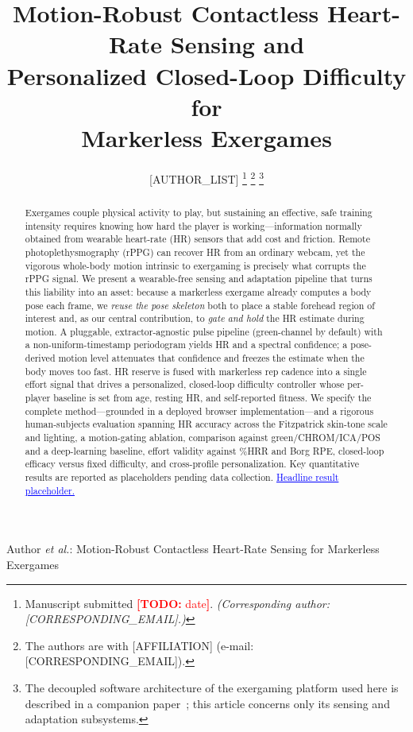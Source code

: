\documentclass[journal,10pt]{IEEEtran}
\newcommand{\todoNote}[1]{\textcolor{red}{\textbf{[TODO:} #1\textbf{]}}}
\newcommand{\result}[1]{\textcolor{blue}{\underline{#1}}}
\begin{document}
\title{Motion-Robust Contactless Heart-Rate Sensing and\\ Personalized Closed-Loop Difficulty for\\ Markerless Exergames}

\author{%
        [AUTHOR\_LIST]%
        \thanks{Manuscript submitted \todoNote{date}. \emph{(Corresponding author: [CORRESPONDING\_EMAIL].)}}%
        \thanks{The authors are with [AFFILIATION] (e-mail: [CORRESPONDING\_EMAIL]).}%
        \thanks{The decoupled software architecture of the exergaming platform used here is described in a companion paper~\cite{fitarcade-sdps}; this article concerns only its sensing and adaptation subsystems.}}

%
{Author \MakeLowercase{\textit{et al.}}: Motion-Robust Contactless Heart-Rate Sensing for Markerless Exergames}

\maketitle

\begin{abstract}
Exergames couple physical activity to play, but sustaining an effective, safe
training intensity requires knowing how hard the player is working---information
normally obtained from wearable heart-rate (HR) sensors that add cost and
friction. Remote photoplethysmography (rPPG) can recover HR from an ordinary
webcam, yet the vigorous whole-body motion intrinsic to exergaming is precisely
what corrupts the rPPG signal. We present a wearable-free sensing and adaptation
pipeline that turns this liability into an asset: because a markerless exergame
already computes a body pose each frame, we \emph{reuse the pose skeleton} both to
place a stable forehead region of interest and, as our central contribution, to
\emph{gate and hold} the HR estimate during motion. A pluggable, extractor-agnostic
pulse pipeline (green-channel by default) with a non-uniform-timestamp periodogram
yields HR and a spectral confidence; a pose-derived motion level attenuates that
confidence and
freezes the estimate when the body moves too fast. HR reserve is fused with
markerless rep cadence into a single effort signal that drives a personalized,
closed-loop difficulty controller whose per-player baseline is set from age,
resting HR, and self-reported fitness. We specify the complete method---grounded
in a deployed browser implementation---and a rigorous human-subjects evaluation
spanning HR accuracy across the Fitzpatrick skin-tone scale and lighting, a
motion-gating ablation, comparison against green/CHROM/ICA/POS and a deep-learning
baseline, effort validity against \%HRR and Borg RPE, closed-loop efficacy versus
fixed difficulty, and cross-profile personalization. Key quantitative results are
reported as placeholders pending data collection. \result{Headline result placeholder.}
\end{abstract}
\end{document}
